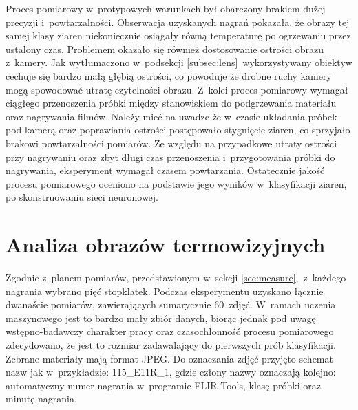 Proces pomiarowy w~protypowych warunkach był obarczony brakiem dużej precyzji
i~powtarzalności.
Obserwacja uzyskanych nagrań pokazała, że obrazy tej samej klasy ziaren
niekoniecznie osiągały równą temperaturę po ogrzewaniu przez ustalony czas.
Problemem okazało się również dostosowanie ostrości obrazu z~kamery.
Jak wytłumaczono w~podsekcji \ref{subsec:lens}~wykorzystywany obiektyw cechuje
się bardzo małą głębią ostrości, co powoduje że drobne ruchy kamery mogą
spowodować utratę czytelności obrazu.
Z~kolei proces pomiarowy wymagał ciągłego przenoszenia próbki między
stanowiskiem do podgrzewania materiału oraz nagrywania filmów.
Należy mieć na uwadze że w~czasie układania próbek pod kamerą oraz poprawiania
ostrości postępowało stygnięcie ziaren, co sprzyjało brakowi powtarzalności
pomiarów.
Ze względu na przypadkowe utraty ostrości przy nagrywaniu oraz zbyt długi czas
przenoszenia i~przygotowania próbki do nagrywania, eksperyment wymagał czasem
powtarzania.
Ostatecznie jakość procesu pomiarowego oceniono na podstawie jego wyników
w~klasyfikacji ziaren, po skonstruowaniu sieci neuronowej.

\section{Analiza obrazów termowizyjnych}
Zgodnie z~planem pomiarów, przedstawionym w~sekcji \ref{sec:measure},~z~każdego
nagrania wybrano pięć stopklatek.
Podczas eksperymentu uzyskano łącznie dwanaście pomiarów, zawierających
sumarycznie 60~zdjęć.
W~ramach uczenia maszynowego jest to bardzo mały zbiór danych, biorąc jednak
pod uwagę wstępno-badawczy charakter pracy oraz czasochłonność procesu
pomiarowego zdecydowano, że jest to rozmiar zadawalający do pierwszych prób
klasyfikacji.
Zebrane materiały mają format JPEG.
Do oznaczania zdjęć przyjęto schemat nazw jak w~przykładzie: 115\_E11R\_1, gdzie
człony nazwy oznaczają kolejno: automatyczny numer nagrania w~programie FLIR
Tools, klasę próbki oraz minutę nagrania.

